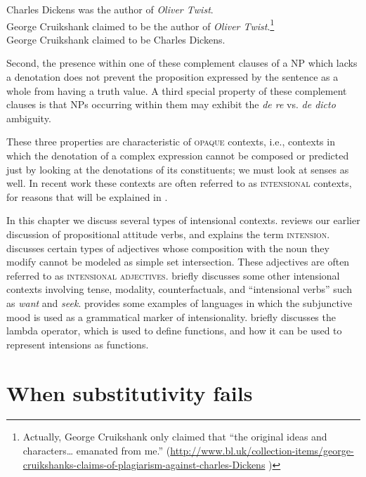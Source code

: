 \ea
\ea Charles Dickens was the author of \textit{Oliver Twist}.\\
\ex George Cruikshank claimed to be the author of \textit{Oliver Twist}.\footnote{Actually, George Cruikshank only claimed that “the original ideas and characters… emanated from me.” (\url{http://www.bl.uk/collection-items/george-cruikshanks-claims-of-plagiarism-against-charles-Dickens} )}\\
\ex George Cruikshank claimed to be Charles Dickens.
                       \z
\z


Second, the presence within one of these complement clauses of a NP which lacks a denotation does not prevent the proposition expressed by the sentence as a whole from having a truth value. A third special property of these complement clauses is that NPs occurring within them may exhibit the \textit{de re} vs. \textit{de dicto} ambiguity.



These three properties are characteristic of \textsc{opaque} contexts, i.e., contexts in which the denotation of a complex expression cannot be composed or predicted just by looking at the denotations of its constituents; we must look at senses as well. In recent work these contexts are often referred to as \textsc{intensional} contexts, for reasons that will be explained in .



In this chapter we discuss several types of intensional contexts.  reviews our earlier discussion of propositional attitude verbs, and explains the term \textsc{intension}.  discusses certain types of adjectives whose composition with the noun they modify cannot be modeled as simple set intersection. These adjectives are often referred to as \textsc{intensional adjectives}.  briefly discusses some other intensional contexts involving tense, modality, counterfactuals, and “intensional verbs” such as \textit{want} and \textit{seek}.  provides some examples of languages in which the subjunctive mood is used as a grammatical marker of intensionality.  briefly discusses the lambda operator, which is used to define functions, and how it can be used to represent intensions as functions.


\section{When substitutivity fails}\label{sec:} %


